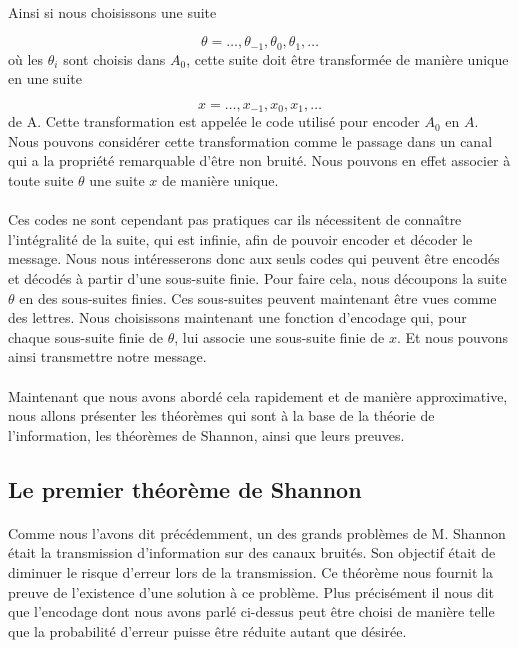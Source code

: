	\paragraph{}
	Ainsi si nous choisissons une suite

	\[\theta = \dots,\theta_{-1},\theta_{0},\theta_{1},\dots\]
	où les $\theta_i$ sont choisis dans $A_0$, cette suite doit être
	transformée de manière unique en une suite

	\[x = \dots,x_{-1},x_{0},x_{1},\dots\]
	de A. Cette transformation est appelée le code utilisé pour encoder $A_0$
	en $A$. Nous pouvons considérer cette transformation comme le passage dans
	un canal qui a la propriété remarquable d'être non bruité. Nous pouvons en
	effet associer à toute suite $\theta$ une suite $x$ 
	de manière unique. 

	\paragraph{}
	Ces codes ne sont cependant pas pratiques car ils nécessitent de connaître
	l'intégralité de la suite, qui est infinie, afin de pouvoir encoder et 
	décoder le message. Nous  nous intéresserons donc aux seuls codes qui
	peuvent être encodés et décodés à partir d'une sous-suite finie. Pour 
	faire cela, nous découpons la suite $\theta$ en des sous-suites 
	finies. Ces sous-suites peuvent maintenant être vues comme des lettres. 
	Nous choisissons maintenant une fonction d'encodage qui, pour chaque 
	sous-suite finie de $\theta$, lui associe une sous-suite finie
	de $x$. Et nous pouvons ainsi transmettre notre message.
	
	\paragraph{}
	Maintenant que nous avons abordé cela rapidement et de manière 
	approximative, nous allons présenter les théorèmes qui sont à la base
	de la théorie de l'information, les théorèmes
	de Shannon, ainsi que leurs preuves.

\subsection{Le premier théorème de Shannon}

	\paragraph{}
	Comme nous l'avons dit précédemment, un des grands problèmes de M. Shannon
	était la transmission d'information sur des canaux bruités. Son objectif
	était de diminuer le risque d'erreur lors de la transmission. Ce théorème
	nous fournit la preuve de l'existence d'une solution à ce problème. 
	Plus précisément il nous dit que l'encodage dont nous avons parlé ci-dessus
	peut être choisi de manière telle que la probabilité d'erreur puisse être 
	réduite autant que désirée.

